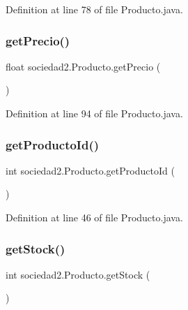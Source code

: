 Definition at line 78 of file Producto.\+java.

\mbox{\label{classsociedad2_1_1_producto_adac1bb4366dc52eef74b5fba4e7018a7}} 
\subsubsection{\texorpdfstring{get\+Precio()}{getPrecio()}}
{\footnotesize\ttfamily float sociedad2.\+Producto.\+get\+Precio (\begin{DoxyParamCaption}{ }\end{DoxyParamCaption})}



Definition at line 94 of file Producto.\+java.

\mbox{\label{classsociedad2_1_1_producto_a501aad8759cd86d3bf35387f6f697970}} 
\subsubsection{\texorpdfstring{get\+Producto\+Id()}{getProductoId()}}
{\footnotesize\ttfamily int sociedad2.\+Producto.\+get\+Producto\+Id (\begin{DoxyParamCaption}{ }\end{DoxyParamCaption})}



Definition at line 46 of file Producto.\+java.

\mbox{\label{classsociedad2_1_1_producto_ac1efc9575ff90b9af915066d43dd4bd4}} 
\subsubsection{\texorpdfstring{get\+Stock()}{getStock()}}
{\footnotesize\ttfamily int sociedad2.\+Producto.\+get\+Stock (\begin{DoxyParamCaption}{ }\end{DoxyParamCaption})}



